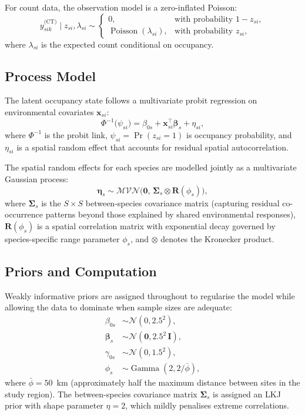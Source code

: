 For count data, the observation model is a zero-inflated Poisson:
\begin{equation}\label{eq:count}
  y_{sik}^{\text{(CT)}} \mid z_{si}, \lambda_{si} \sim
  \begin{cases}
    0,                                 & \text{with probability } 1 - z_{si}, \\
    \operatorname{Poisson}(\lambda_{si}), & \text{with probability } z_{si},
  \end{cases}
\end{equation}
where $\lambda_{si}$ is the expected count conditional on occupancy.

\subsection{Process Model}

The latent occupancy state follows a multivariate probit regression on
environmental covariates $\mathbf{x}_{si}$:
\begin{equation}\label{eq:process}
  \Phi^{-1}\big(\psi_{si}\big) =
  \beta_{0s} + \mathbf{x}_{si}^\top \boldsymbol{\beta}_s + \eta_{si},
\end{equation}
where $\Phi^{-1}$ is the probit link, $\psi_{si} = \Pr(z_{si}=1)$ is occupancy
probability, and $\eta_{si}$ is a spatial random effect that accounts for
residual spatial autocorrelation.

The spatial random effects for each species are modelled jointly as a
multivariate Gaussian process:
\begin{equation}\label{eq:spatial}
  \boldsymbol{\eta}_s \sim
  \mathcal{MVN}\!\big(\mathbf{0}, \,\boldsymbol{\Sigma}_s \otimes
  \mathbf{R}(\phi_s)\big),
\end{equation}
where $\boldsymbol{\Sigma}_s$ is the $S \times S$ between-species covariance
matrix (capturing residual co-occurrence patterns beyond those explained by
shared environmental responses), $\mathbf{R}(\phi_s)$ is a spatial correlation
matrix with exponential decay governed by species-specific range parameter
$\phi_s$, and $\otimes$ denotes the Kronecker product.

\subsection{Priors and Computation}

Weakly informative priors are assigned throughout to regularise the model while
allowing the data to dominate when sample sizes are adequate:
\begin{align}
  \beta_{0s}       &\sim \mathcal{N}(0, 2.5^2), \\
  \boldsymbol{\beta}_s &\sim \mathcal{N}(\mathbf{0}, 2.5^2\,\mathbf{I}), \\
  \gamma_{0s}      &\sim \mathcal{N}(0, 1.5^2), \\
  \phi_s           &\sim \operatorname{Gamma}(2, 2/\bar{\phi}),
\end{align}
where $\bar{\phi} = 50$~km (approximately half the maximum distance between
sites in the study region). The between-species covariance matrix
$\boldsymbol{\Sigma}_s$ is assigned an LKJ prior with shape parameter
$\eta = 2$, which mildly penalises extreme correlations.

